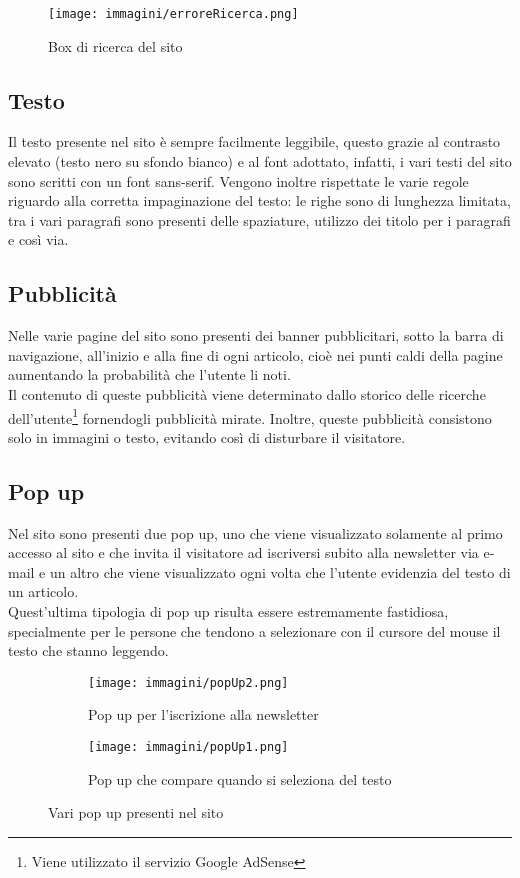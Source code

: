 \begin{figure}[htpb]
\begin{center}
\texttt{[image: immagini/erroreRicerca.png]}
\caption{Box di ricerca del sito}
\label{errRicerca}
\end{center}
\end{figure}
\FloatBarrier

\subsection{Testo}%
Il testo presente nel sito è sempre facilmente leggibile, questo grazie al contrasto elevato (testo nero su sfondo bianco) e al font adottato, infatti, i vari testi del sito sono scritti con un font sans-serif.
Vengono inoltre rispettate le varie regole riguardo alla corretta impaginazione del testo: le righe sono di lunghezza limitata, tra i vari paragrafi sono presenti delle spaziature, utilizzo dei titolo per i paragrafi e così via.


\subsection{Pubblicità}%
Nelle varie pagine del sito sono presenti dei banner pubblicitari, sotto la barra di navigazione, all'inizio e alla fine di ogni articolo, cioè nei punti caldi della pagine aumentando la probabilità che l'utente li noti.\\
Il contenuto di queste pubblicità viene determinato dallo storico delle ricerche dell'utente\footnote{Viene utilizzato il servizio Google AdSense} fornendogli pubblicità mirate. Inoltre, queste pubblicità consistono solo in immagini o testo, evitando così di disturbare il visitatore.

\subsection{Pop up}%
Nel sito sono presenti due pop up, uno che viene visualizzato solamente al primo accesso al sito e che invita il visitatore ad iscriversi subito alla newsletter via e-mail e un altro che viene visualizzato ogni volta che l'utente evidenzia del testo di un articolo.\\
Quest'ultima tipologia di pop up risulta essere estremamente fastidiosa, specialmente per le persone che tendono a selezionare con il cursore del mouse il testo che stanno leggendo.

\begin{figure}
\centering
\begin{subfigure}{.5\textwidth}
  \centering
  \texttt{[image: immagini/popUp2.png]}
  \caption{Pop up per l'iscrizione alla newsletter}
  \label{fig:sub1}
\end{subfigure}%
\begin{subfigure}{.5\textwidth}
  \centering
  \texttt{[image: immagini/popUp1.png]}
  \caption{Pop up che compare quando si seleziona del testo}
  \label{fig:sub2}
\end{subfigure}

\caption{Vari pop up presenti nel sito}
\label{popUp}
\end{figure}

